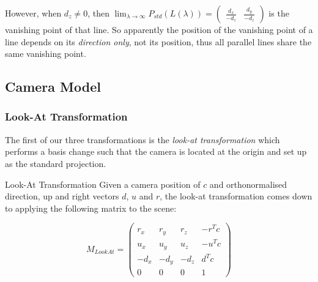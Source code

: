 \documentclass{panikzettel}
\begin{document}
However, when $d_z \neq 0$, then $\lim_{\lambda \to \infty} P_{std} (L(\lambda)) = \begin{pmatrix} \frac{d_x}{-d_z} & \frac{d_y}{-d_z}\end{pmatrix}$ is the vanishing point of that line. So apparently the position of the vanishing point of a line depends on its \emph{direction only}, not its position, thus all parallel lines share the same vanishing point.


\begin{halfboxl}
\vspace{-\baselineskip}
\subsection{Camera Model}

\subsubsection*{Look-At Transformation}

The first of our three transformations is the \emph{look-at transformation} which performs a basis change such that the camera is located at the origin and set up as the standard projection.
\end{halfboxl}%
\begin{halfboxr}
\vspace{-\baselineskip}
\begin{defi}{Look-At Transformation}
Given a camera position of $c$ and orthonormalised direction, up and right vectors $d$, $u$ and $r$, the look-at transformation comes down to applying the following matrix to the scene:

$$M_{LookAt} = \begin{pmatrix}
r_x & r_y & r_z & -r^Tc \\
u_x & u_y & u_z & -u^Tc \\
-d_x & -d_y & -d_z & d^Tc \\
0 & 0 & 0 & 1
\end{pmatrix}$$

\end{defi}
\end{halfboxr}
\end{document}

